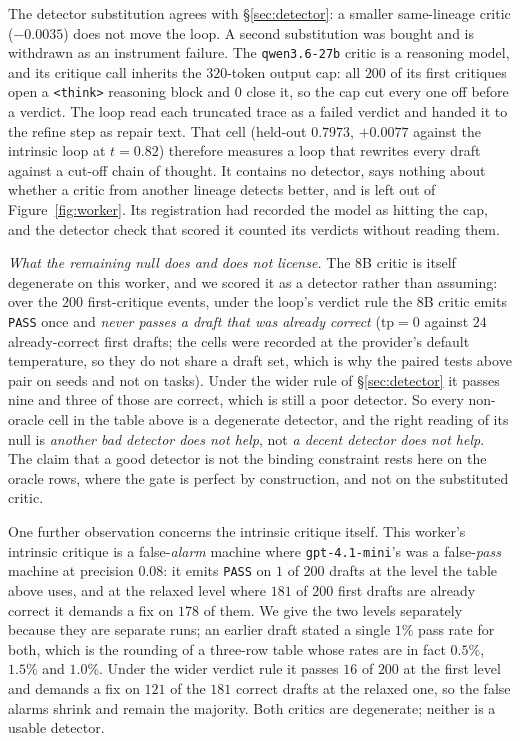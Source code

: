 \documentclass[11pt]{article}
\begin{document}
The detector substitution agrees with \S\ref{sec:detector}: a smaller same-lineage critic
($-0.0035$) does not move the loop. A second substitution was bought and is withdrawn as an
instrument failure. The \texttt{qwen3.6-27b} critic is a reasoning model, and its critique call
inherits the $320$-token output cap: all $200$ of its first critiques open a \texttt{<think>}
reasoning block and $0$ close it, so the cap cut every one off before a verdict. The loop read
each truncated trace as a failed verdict and handed it to the refine step as repair text. That
cell (held-out $0.7973$, $+0.0077$ against the intrinsic loop at $t = 0.82$) therefore measures a
loop that rewrites every draft against a cut-off chain of thought. It contains no detector, says
nothing about whether a critic from another lineage detects better, and is left out of
Figure~\ref{fig:worker}. Its registration had recorded the model as hitting the cap, and the detector check that
scored it counted its verdicts without reading them.

\emph{What the remaining null does and does not license.} The 8B critic is itself degenerate on this
worker, and we scored it as a detector rather than assuming: over the $200$ first-critique events,
under the loop's verdict rule the 8B critic emits \texttt{PASS} once and \emph{never passes a draft
that was already correct} ($\mathrm{tp}=0$ against $24$ already-correct first drafts; the cells
were recorded at the provider's default temperature, so they do not share a draft set, which is
why the paired tests above pair on seeds and not on tasks). Under the wider rule of
\S\ref{sec:detector} it passes nine and three of those are correct, which is still a poor
detector. So every non-oracle cell in the table above is a degenerate detector, and the right
reading of its null is \emph{another bad detector does not help}, not \emph{a decent detector
does not help}. The claim that a good detector is not the binding constraint rests here on the
oracle rows, where the gate is perfect by construction, and not on the substituted critic.

One further observation concerns the intrinsic critique itself. This worker's
intrinsic critique is a false-\emph{alarm} machine where \texttt{gpt-4.1-mini}'s was a
false-\emph{pass} machine at precision $0.08$: it emits \texttt{PASS} on $1$ of $200$ drafts at
the level the table above uses, and at the relaxed level where $181$ of $200$ first drafts are
already correct it demands a fix on $178$ of them. We give the two levels separately because
they are separate runs; an earlier draft stated a single $1\%$ pass rate for both, which is the
rounding of a three-row table whose rates are in fact $0.5\%$, $1.5\%$ and $1.0\%$. Under the
wider verdict rule it passes $16$ of $200$ at the first level and demands a fix on $121$ of the
$181$ correct drafts at the relaxed one, so the false alarms shrink and remain the majority. Both
critics are degenerate; neither is a usable detector.
\end{document}
